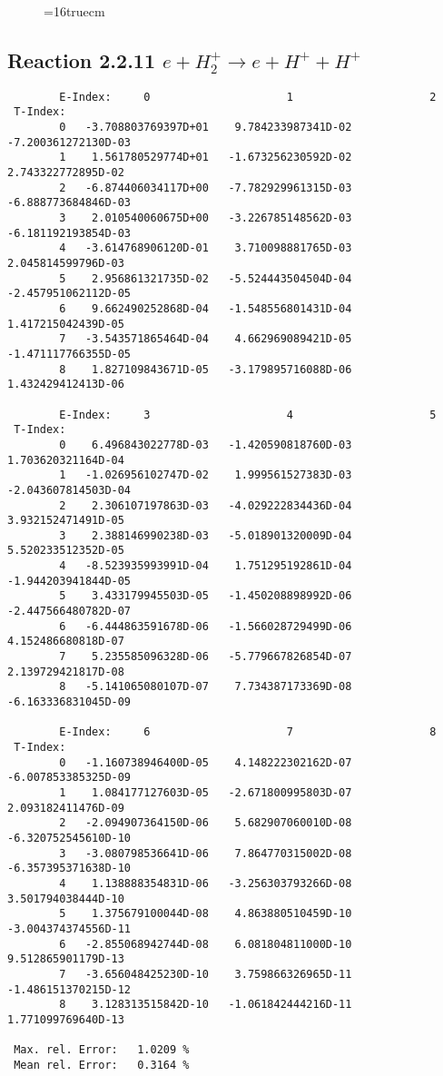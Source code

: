 \documentclass[12pt]{article}
\begin{document}
\begin{figure} \label{2.2.10}
\epsfxsize=16truecm
\end{figure}
\newpage



\subsection{
Reaction 2.2.11   $e + H_2^+      \rightarrow e + H^+ + H^+ $
}


\begin{small}\begin{verbatim}
        E-Index:     0                     1                     2
 T-Index:
        0   -3.708803769397D+01    9.784233987341D-02   -7.200361272130D-03
        1    1.561780529774D+01   -1.673256230592D-02    2.743322772895D-02
        2   -6.874406034117D+00   -7.782929961315D-03   -6.888773684846D-03
        3    2.010540060675D+00   -3.226785148562D-03   -6.181192193854D-03
        4   -3.614768906120D-01    3.710098881765D-03    2.045814599796D-03
        5    2.956861321735D-02   -5.524443504504D-04   -2.457951062112D-05
        6    9.662490252868D-04   -1.548556801431D-04    1.417215042439D-05
        7   -3.543571865464D-04    4.662969089421D-05   -1.471117766355D-05
        8    1.827109843671D-05   -3.179895716088D-06    1.432429412413D-06

        E-Index:     3                     4                     5
 T-Index:
        0    6.496843022778D-03   -1.420590818760D-03    1.703620321164D-04
        1   -1.026956102747D-02    1.999561527383D-03   -2.043607814503D-04
        2    2.306107197863D-03   -4.029222834436D-04    3.932152471491D-05
        3    2.388146990238D-03   -5.018901320009D-04    5.520233512352D-05
        4   -8.523935993991D-04    1.751295192861D-04   -1.944203941844D-05
        5    3.433179945503D-05   -1.450208898992D-06   -2.447566480782D-07
        6   -6.444863591678D-06   -1.566028729499D-06    4.152486680818D-07
        7    5.235585096328D-06   -5.779667826854D-07    2.139729421817D-08
        8   -5.141065080107D-07    7.734387173369D-08   -6.163336831045D-09

        E-Index:     6                     7                     8
 T-Index:
        0   -1.160738946400D-05    4.148222302162D-07   -6.007853385325D-09
        1    1.084177127603D-05   -2.671800995803D-07    2.093182411476D-09
        2   -2.094907364150D-06    5.682907060010D-08   -6.320752545610D-10
        3   -3.080798536641D-06    7.864770315002D-08   -6.357395371638D-10
        4    1.138888354831D-06   -3.256303793266D-08    3.501794038444D-10
        5    1.375679100044D-08    4.863880510459D-10   -3.004374374556D-11
        6   -2.855068942744D-08    6.081804811000D-10    9.512865901179D-13
        7   -3.656048425230D-10    3.759866326965D-11   -1.486151370215D-12
        8    3.128313515842D-10   -1.061842444216D-11    1.771099769640D-13

 Max. rel. Error:   1.0209 %
 Mean rel. Error:   0.3164 %

\end{verbatim}\end{small}
\end{document}
